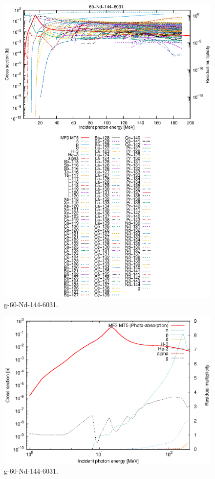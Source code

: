 \begin{figure}
 \includegraphics[width=\linewidth]{eps/g_60-Nd-144_6031.eps}
  \caption{g-60-Nd-144-6031.}
\end{figure}
\newpage \clearpage

\begin{figure}
 \includegraphics[width=\linewidth]{eps-log/g_60-Nd-144_6031.eps}
 \caption{g-60-Nd-144-6031.}
\end{figure}
\newpage \clearpage

